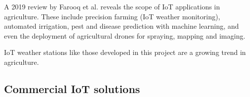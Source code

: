 A 2019 review by Farooq et al. \cite{farooq2019iot} reveals the scope of IoT
applications in agriculture. These include precision farming (IoT weather
monitoring), automated irrigation, pest and disease prediction with machine
learning, and even the deployment of agricultural drones for spraying, mapping
and imaging. 

IoT weather stations like those developed in this project are a growing trend in
agriculture.

\subsection{Commercial IoT solutions}